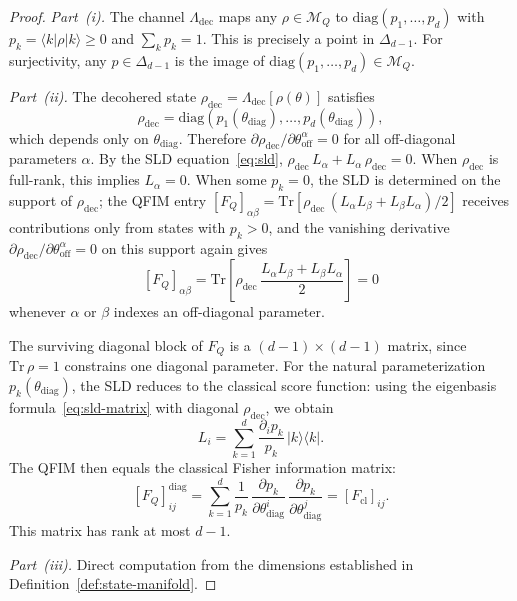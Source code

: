 \documentclass[12pt,a4paper]{article}
\theoremstyle{definition}
\theoremstyle{remark}
\begin{document}
\begin{proof}
\emph{Part~(i).} The channel $\Lambda_{\mathrm{dec}}$ maps any $\rho \in \mathcal{M}_Q$ to $\mathrm{diag}(p_1, \ldots, p_d)$ with $p_k = \langle k|\rho|k\rangle \geq 0$ and $\sum_k p_k = 1$. This is precisely a point in $\Delta_{d-1}$. For surjectivity, any $p \in \Delta_{d-1}$ is the image of $\mathrm{diag}(p_1, \ldots, p_d) \in \mathcal{M}_Q$.

\emph{Part~(ii).} The decohered state $\rho_{\mathrm{dec}} = \Lambda_{\mathrm{dec}}[\rho(\theta)]$ satisfies
\[
\rho_{\mathrm{dec}} = \mathrm{diag}(p_1(\theta_{\mathrm{diag}}), \ldots, p_d(\theta_{\mathrm{diag}})),
\]
which depends only on $\theta_{\mathrm{diag}}$. Therefore $\partial \rho_{\mathrm{dec}} / \partial \theta_{\mathrm{off}}^\alpha = 0$ for all off-diagonal parameters $\alpha$. By the SLD equation~\eqref{eq:sld}, $\rho_{\mathrm{dec}}\, L_\alpha + L_\alpha\, \rho_{\mathrm{dec}} = 0$. When $\rho_{\mathrm{dec}}$ is full-rank, this implies $L_\alpha = 0$. When some $p_k = 0$, the SLD is determined on the support of $\rho_{\mathrm{dec}}$; the QFIM entry $[F_Q]_{\alpha\beta} = \mathrm{Tr}[\rho_{\mathrm{dec}}\,(L_\alpha L_\beta + L_\beta L_\alpha)/2]$ receives contributions only from states with $p_k > 0$, and the vanishing derivative $\partial \rho_{\mathrm{dec}} / \partial \theta_{\mathrm{off}}^\alpha = 0$ on this support again gives
\[
[F_Q]_{\alpha\beta} = \mathrm{Tr}\!\left[\rho_{\mathrm{dec}}\,\frac{L_\alpha L_\beta + L_\beta L_\alpha}{2}\right] = 0
\]
whenever $\alpha$ or $\beta$ indexes an off-diagonal parameter.

The surviving diagonal block of $F_Q$ is a $(d-1) \times (d-1)$ matrix, since $\mathrm{Tr}\,\rho = 1$ constrains one diagonal parameter. For the natural parameterization $p_k(\theta_{\mathrm{diag}})$, the SLD reduces to the classical score function: using the eigenbasis formula~\eqref{eq:sld-matrix} with diagonal $\rho_{\mathrm{dec}}$, we obtain
\[
L_i = \sum_{k=1}^d \frac{\partial_i p_k}{p_k}\, |k\rangle\langle k|.
\]
The QFIM then equals the classical Fisher information matrix:
\begin{equation}
\label{eq:qfim-classical}
[F_Q]_{ij}^{\mathrm{diag}} = \sum_{k=1}^d \frac{1}{p_k}\, \frac{\partial p_k}{\partial \theta_{\mathrm{diag}}^i}\, \frac{\partial p_k}{\partial \theta_{\mathrm{diag}}^j} = [F_{\mathrm{cl}}]_{ij}.
\end{equation}
This matrix has rank at most $d - 1$.

\emph{Part~(iii).} Direct computation from the dimensions established in Definition~\ref{def:state-manifold}.
\end{proof}
\end{document}
